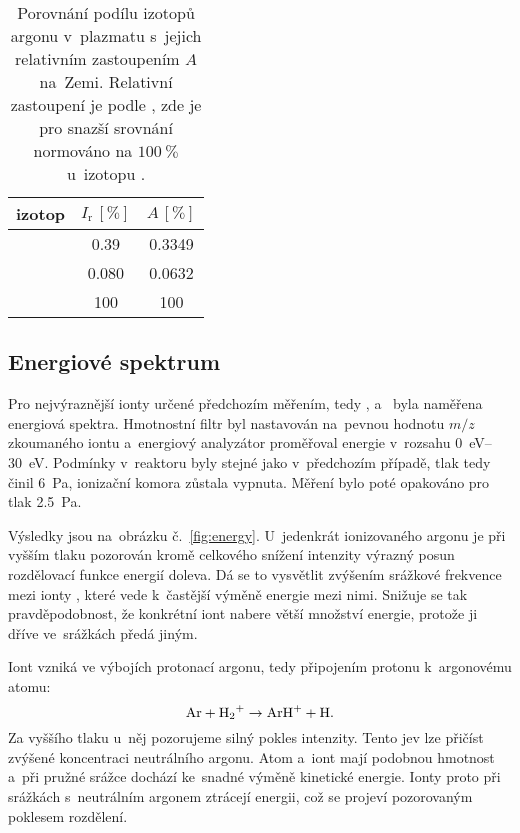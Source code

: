 \documentclass{protokol}
\newcommand\mz{m/z}
\newcommand\intens{I}
\newcommand\intensrel{\intens_\mathrm{r}}
\newcommand\abundance{A}
\begin{document}
\begin{table}
	\centering
	\caption{Porovnání podílu izotopů argonu v~plazmatu
		s~jejich relativním zastoupením $\abundance$ na~Zemi.
		Relativní zastoupení je podle \parencite{nist-ar},
		zde je pro snazší srovnání normováno
		na $\SI{100}\percent$ u~izotopu .}
	\label{tab:plasma-isotopes}
	\begin{tabular}{l S[table-format=3.3] S[table-format=3.4]}
		\toprule
		izotop & ${\intensrel\,[\si\percent]}$ &
			${\abundance\,[\si\percent]}$ \\
		\midrule
		 & 0.39  & 0.3349 \\
		 & 0.080 & 0.0632 \\
		 & 100   & 100    \\
		\bottomrule
	\end{tabular}
\end{table}

\subsection{Energiové spektrum}
\label{sec:energy}
Pro nejvýraznější ionty určené předchozím měřením,
tedy ,  a~ byla naměřena energiová spektra.
Hmotnostní filtr byl nastavován na~pevnou hodnotu $\mz$ zkoumaného iontu
a~energiový analyzátor proměřoval energie v~rozsahu
\SIrange{0}{30}{\electronvolt}.
Podmínky v~reaktoru byly stejné jako v~předchozím případě,
tlak tedy činil \SI{6}{\pascal}, ionizační komora zůstala vypnuta.
Měření bylo poté opakováno pro tlak \SI{2.5}{\pascal}.

Výsledky jsou na~obrázku č.~\ref{fig:energy}.
U~jedenkrát ionizovaného argonu je při vyšším tlaku pozorován kromě
celkového snížení intenzity výrazný posun rozdělovací funkce energií doleva.
Dá se to vysvětlit zvýšením srážkové frekvence mezi ionty ,
které vede k~častější výměně energie mezi nimi.
Snižuje se tak pravděpodobnost, že konkrétní iont nabere větší
množství energie, protože ji dříve ve~srážkách předá jiným.

Iont  vzniká ve výbojích protonací argonu, tedy připojením
protonu k~argonovému atomu:
\begin{equation}
	\label{eq:arh}
	\ce{Ar} + \ce{H2+} \rightarrow \ce{ArH+} + \ce{H}.
\end{equation}
Za vyššího tlaku u~něj pozorujeme silný pokles intenzity.
Tento jev lze přičíst zvýšené koncentraci neutrálního argonu.
Atom  a~iont  mají podobnou hmotnost a~při pružné srážce
dochází ke~snadné výměně kinetické energie.
Ionty proto při srážkách s~neutrálním argonem ztrácejí energii,
což se projeví pozorovaným poklesem rozdělení.
\end{document}
